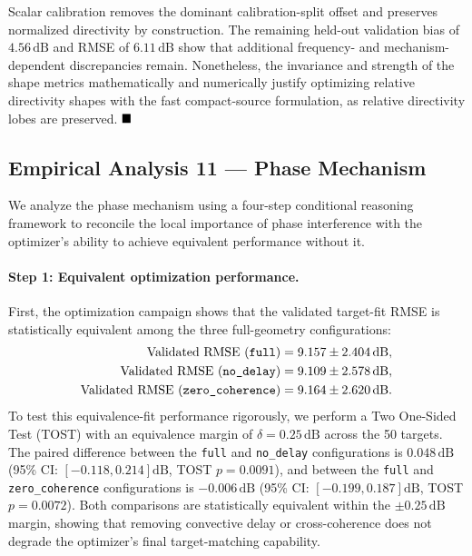 \documentclass[11pt]{article}
\begin{document}
Scalar calibration removes the dominant calibration-split offset and preserves normalized directivity by construction. The remaining held-out validation bias of $4.56\,\mathrm{dB}$ and RMSE of $6.11\,\mathrm{dB}$ show that additional frequency- and mechanism-dependent discrepancies remain. Nonetheless, the invariance and strength of the shape metrics mathematically and numerically justify optimizing relative directivity shapes with the fast compact-source formulation, as relative directivity lobes are preserved. $\hfill \blacksquare$

\subsection{Empirical Analysis 11 --- Phase Mechanism}

We analyze the phase mechanism using a four-step conditional reasoning framework to reconcile the local importance of phase interference with the optimizer's ability to achieve equivalent performance without it.

\paragraph{Step 1: Equivalent optimization performance.}
First, the optimization campaign shows that the validated target-fit RMSE is statistically equivalent among the three full-geometry configurations:
\begin{align*}
    \text{Validated RMSE (\texttt{full})} &= 9.157 \pm 2.404\,\mathrm{dB}, \\
    \text{Validated RMSE (\texttt{no\_delay})} &= 9.109 \pm 2.578\,\mathrm{dB}, \\
    \text{Validated RMSE (\texttt{zero\_coherence})} &= 9.164 \pm 2.620\,\mathrm{dB}.
\end{align*}
To test this equivalence-fit performance rigorously, we perform a Two One-Sided Test (TOST) with an equivalence margin of $\delta = 0.25\,\mathrm{dB}$ across the 50 targets. The paired difference between the \texttt{full} and \texttt{no\_delay} configurations is $0.048\,\mathrm{dB}$ (95\% CI: $[-0.118, 0.214]\mathrm{dB}$, TOST $p = 0.0091$), and between the \texttt{full} and \texttt{zero\_coherence} configurations is $-0.006\,\mathrm{dB}$ (95\% CI: $[-0.199, 0.187]\mathrm{dB}$, TOST $p = 0.0072$). Both comparisons are statistically equivalent within the $\pm0.25\,\mathrm{dB}$ margin, showing that removing convective delay or cross-coherence does not degrade the optimizer's final target-matching capability.
\end{document}

